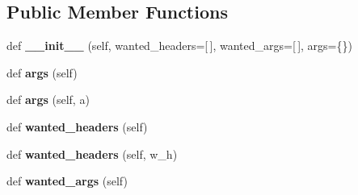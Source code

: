 \subsection*{Public Member Functions}
\begin{DoxyCompactItemize}
\item 
\mbox{\label{class_r_a_i_d5_1_1common_1_1services_1_1base__service_1_1_base_service_a82d70b601ced4d8a265ad9c2895d1321}} 
def {\bfseries \+\_\+\+\_\+init\+\_\+\+\_\+} (self, wanted\+\_\+headers=\mbox{[}$\,$\mbox{]}, wanted\+\_\+args=\mbox{[}$\,$\mbox{]}, args=\{\})
\item 
\mbox{\label{class_r_a_i_d5_1_1common_1_1services_1_1base__service_1_1_base_service_aa52ac7f28702d461220e448726f39c54}} 
def {\bfseries args} (self)
\item 
\mbox{\label{class_r_a_i_d5_1_1common_1_1services_1_1base__service_1_1_base_service_a7f5af0d2a6986026aea8a69f71934f8f}} 
def {\bfseries args} (self, a)
\item 
\mbox{\label{class_r_a_i_d5_1_1common_1_1services_1_1base__service_1_1_base_service_a152e00847b5be2beb3cdaa19fd1f7286}} 
def {\bfseries wanted\+\_\+headers} (self)
\item 
\mbox{\label{class_r_a_i_d5_1_1common_1_1services_1_1base__service_1_1_base_service_afcc19960fd34594a84b1ca4e17523adc}} 
def {\bfseries wanted\+\_\+headers} (self, w\+\_\+h)
\item 
\mbox{\label{class_r_a_i_d5_1_1common_1_1services_1_1base__service_1_1_base_service_a40a554ce7aaf51a959ab4083305635df}} 
def {\bfseries wanted\+\_\+args} (self)
\item 
\mbox{\label{class_r_a_i_d5_1_1common_1_1services_1_1base__service_1_1_base_service_a4248500b960b9db631452d256fe4ed6d}} 

\end{DoxyCompactItemize}
